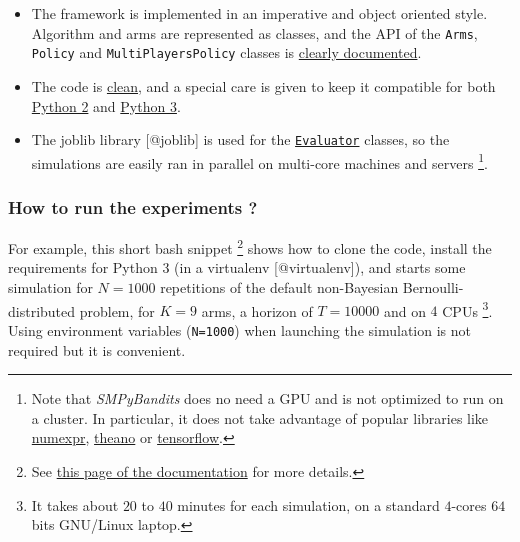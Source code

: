 \begin{itemize}
\tightlist
\item
  The framework is implemented in an imperative and object oriented
  style. Algorithm and arms are represented as classes, and the API of
  the \texttt{Arms}, \texttt{Policy} and \texttt{MultiPlayersPolicy}
  classes is \href{https://smpybandits.github.io/API.html}{clearly
  documented}.
\item
  The code is
  \href{https://smpybandits.github.io/logs/main_pylint_log.txt}{clean},
  and a special care is given to keep it compatible for both
  \href{https://smpybandits.github.io/logs/main_pylint_log.txt}{Python
  2} and
  \href{https://smpybandits.github.io/logs/main_pylint3_log.txt}{Python
  3}.
\item
  The joblib library {[}@joblib{]} is used for the
  \href{https://smpybandits.github.io/docs/Environment.Evaluator.html}{\texttt{Evaluator}}
  classes, so the simulations are easily ran in parallel on multi-core
  machines and servers \footnote{Note that \emph{SMPyBandits} does no
    need a GPU and is not optimized to run on a cluster. In particular,
    it does not take advantage of popular libraries like
    \href{https://github.com/pydata/numexpr}{numexpr},
    \href{http://www.deeplearning.net/software/theano/}{theano} or
    \href{https://www.tensorflow.org/}{tensorflow}.}.
\end{itemize}

\hypertarget{how-to-run-the-experiments}{%
\subsubsection{How to run the experiments
?}\label{how-to-run-the-experiments}}

For example, this short bash snippet \footnote{See
  \href{https://smpybandits.github.io/How_to_run_the_code.html}{this
  page of the documentation} for more details.} shows how to clone the
code, install the requirements for Python 3 (in a virtualenv
{[}@virtualenv{]}), and starts some simulation for \(N=1000\)
repetitions of the default non-Bayesian Bernoulli-distributed problem,
for \(K=9\) arms, a horizon of \(T=10000\) and on \(4\) CPUs \footnote{It
  takes about \(20\) to \(40\) minutes for each simulation, on a
  standard \(4\)-cores \(64\) bits GNU/Linux laptop.}. Using environment
variables (\texttt{N=1000}) when launching the simulation is not
required but it is convenient.

